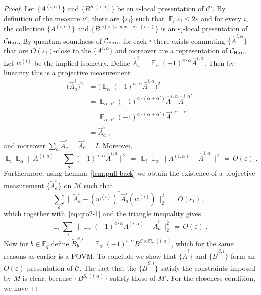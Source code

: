\documentclass[11pt]{article}
\theoremstyle{definition}
\newcommand{\code}{\mathcal{C}}
\newcommand{\Id}{\ensuremath{I}}
\DeclareMathOperator*{\Expectation}{\mathbb{E}}
\newcommand{\Es}[1]{\Expectation_{#1}}
\newcommand{\F}{\ensuremath{\mathbb{F}}}
\newcommand{\cM}{\ensuremath{\mathcal{M}}}
\newcommand{\Had}{\ensuremath{\textsc{Had}}}
\newcommand{\eps}{\varepsilon}
\begin{document}
\begin{proof}
Let $\{A^{(i,\alpha)}\}$ and $\{B^{S,(i,\alpha)}\}$ be an $\eps$-local presentation of $\code'$. By definition of the measure $\nu'$, there are $\{\eps_i\}$ such that $\Es{i} \eps_i \leq 2\eps$ and for every $i$, the collection $\{A^{(i,\alpha)}\}$ and $\{B^{\{i\}\times \{x,y,x+y\},(i,x)}\}$ is an $\eps_i$-local presentation of $\code_\Had$. By quantum soundness of $\code_\Had$, for each $i$ there exists commuting $\{\hat{A}^{i,\alpha}\}$ that are $O(\eps_i)$-close to the $\{A^{i,\alpha}\}$ and moreover are a representation of $\code_{\Had}$. Let $w^{(i)}$ be the implied isometry.
Define $\hat{A}^{i}_{a}=\Es{\alpha}(-1)^{a\cdot \alpha} \hat{A}^{i,\alpha}$. Then by linearity this is a projective measurement:
\begin{align*}
\big(\hat{A}^{i}_{a}\big)^2 &=\Big(\Es{\alpha}(-1)^{a\cdot \alpha} \hat{A}^{i,\alpha}\Big)^2\\
&= \Es{\alpha,\alpha' }(-1)^{a\cdot (\alpha+\alpha')} \hat{A}^{i,\alpha}\hat{A}^{i,\alpha'}\\
&=\Es{\alpha,\alpha' }(-1)^{a\cdot (\alpha+\alpha')} \hat{A}^{i,\alpha+\alpha'}\\
&=\hat{A}^{i}_{a}\;,
\end{align*}
and moreover $\sum_a \hat{A}^{i}_{a} = \hat{A}^{i}_{0}=\Id$. Moreover,
\begin{equation}\label{eq:qto2-1}
\Es{i} \Es{\alpha}  \Big\| A^{(i,\alpha)} - \sum_a (-1)^{a\cdot\alpha}\hat{A}^{i,a}\Big\|^2
\,=\, \Es{i} \Es{\alpha}  \big\| A^{(i,\alpha)} - \hat{A}^{i,\alpha}\big\|^2 \,=\, O(\eps)\;.
\end{equation}
Furthermore, using Lemma~\ref{lem:pull-back} we obtain the existence of a projective measurement $\{\tilde{A}^{i}_{a}\}$ on $\cM$ such that
\[ \sum_a \big\| \tilde{A}^i_a - (w^{(i)})^* \hat{A}^i_a (w^{(i)}) \big\|_2^2 \,=\, O(\eps_i)\;,\]
which together with~\eqref{eq:qto2-1} and the triangle inequality gives
\begin{equation}\label{eq:qto2-2}
 \Es{i} \sum_a \Big\| \Es{\alpha} (-1)^{a\cdot \alpha} A^{(i,\alpha)} -  \tilde{A}^i_a \Big\|_2^2 \,=\, O(\eps)\;.
\end{equation}
Now for $b\in \F_q$ define $\tilde{B}^{S,i}_b= \Es{\alpha} (-1)^{b\cdot \alpha} B^{S\times \F_2^t,(i,\alpha)}$, which for the same reasons as earlier is a POVM. 
To conclude we show that $\{\tilde{A}^{i}\}$ and $\{\tilde{B}^{S,i}\}$ form an $O(\eps)$-presentation of $\code$. The fact that the $\{\tilde{B}^{S,i}\}$ satisfy the constraints imposed by $M$ is clear, because $\{B^{S,(i,\alpha)}\}$ satisfy those of $M'$. For the closeness condition, we have

\end{proof}
\end{document}
